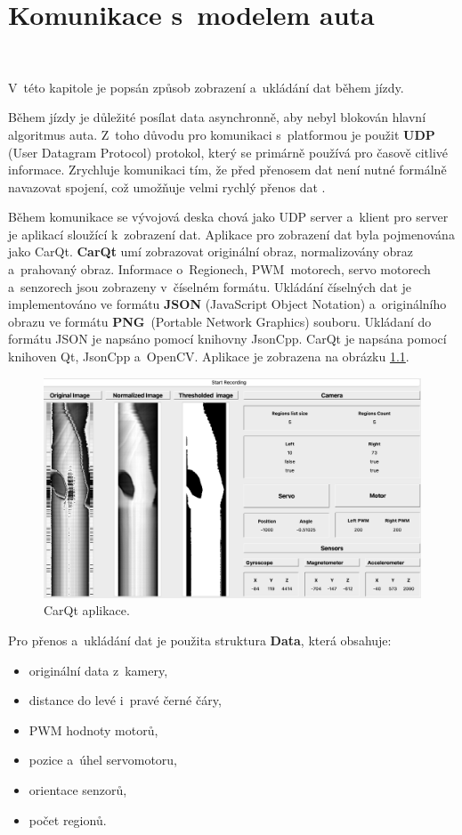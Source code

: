 \chapter{Komunikace s~modelem auta}
\label{sec:PlatformCommunication}\

V~této kapitole je popsán způsob zobrazení a~ukládání dat během jízdy.

Během jízdy je důležité posílat data asynchronně, aby nebyl blokován hlavní
algoritmus auta. Z~toho důvodu pro komunikaci s~platformou je použit \textbf{UDP}
(User Datagram Protocol) protokol, který se primárně používá pro časově citlivé
informace. Zrychluje komunikaci tím, že před přenosem dat není nutné formálně
navazovat spojení, což umožňuje velmi rychlý přenos dat \cite{UDP}.

Během komunikace se vývojová deska chová jako UDP server a~klient pro server je
aplikací sloužící k~zobrazení dat. Aplikace pro zobrazení dat byla pojmenována jako
CarQt. \textbf{CarQt} umí zobrazovat originální obraz, normalizovány obraz
a~prahovaný obraz. Informace o~Regionech, PWM~motorech, servo motorech a~senzorech
jsou zobrazeny v~číselném formátu. Ukládání číselných dat je implementováno ve
formátu \textbf{JSON} (JavaScript Object Notation) a~originálního obrazu ve formátu
\textbf{PNG}~(Portable Network Graphics) souboru. Ukládaní do formátu JSON je napsáno pomocí knihovny JsonCpp. CarQt je napsána pomocí knihoven
Qt, JsonCpp a~OpenCV. Aplikace je zobrazena na obrázku \ref{fig:CarQt}.

\begin{figure}[!h]
    \centering
    \vspace{-10pt}
    \includegraphics[width = .8\linewidth]{Figures/CarQt.png}
    \caption{CarQt aplikace.}
    \label{fig:CarQt}
    \vspace{-15pt}
\end{figure}

Pro přenos a~ukládání dat je použita struktura \textbf{Data}, která obsahuje:
\begin{itemize}
    \item originální data z~kamery,
    \item distance do levé i~pravé černé čáry,
    \item PWM hodnoty motorů,
    \item pozice a~úhel servomotoru,
    \item orientace senzorů,
    \item počet regionů.
\end{itemize}

